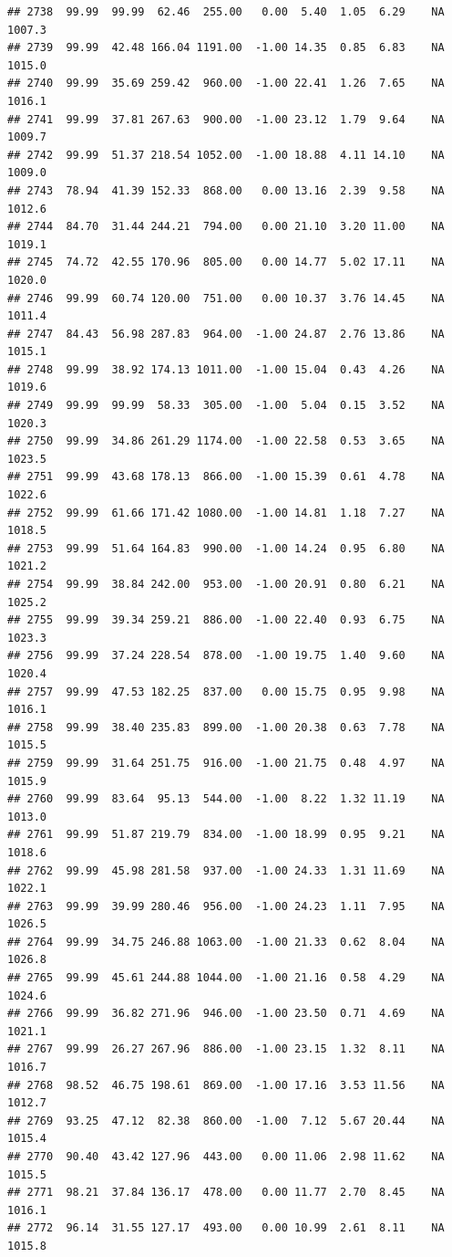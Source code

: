 \documentclass{article}\usepackage{graphicx, color}
\makeatletter
\newenvironment{kframe}{%
 \def\at@end@of@kframe{}%
 \ifinner\ifhmode%
  \def\at@end@of@kframe{\end{minipage}}%
  \begin{minipage}{\columnwidth}%
 \fi\fi%
 \def\FrameCommand##1{\hskip\@totalleftmargin \hskip-\fboxsep
 \colorbox{shadecolor}{##1}\hskip-\fboxsep
     \hskip-\linewidth \hskip-\@totalleftmargin \hskip\columnwidth}%
 \MakeFramed {\advance\hsize-\width
   \@totalleftmargin\z@ \linewidth\hsize
   \@setminipage}}%
 {\par\unskip\endMakeFramed%
 \at@end@of@kframe}
\newenvironment{knitrout}{}{} %
\makeatother
\begin{document}
\begin{knitrout}
\begin{kframe}
\begin{verbatim}
## 2738  99.99  99.99  62.46  255.00   0.00  5.40  1.05  6.29    NA 1007.3
## 2739  99.99  42.48 166.04 1191.00  -1.00 14.35  0.85  6.83    NA 1015.0
## 2740  99.99  35.69 259.42  960.00  -1.00 22.41  1.26  7.65    NA 1016.1
## 2741  99.99  37.81 267.63  900.00  -1.00 23.12  1.79  9.64    NA 1009.7
## 2742  99.99  51.37 218.54 1052.00  -1.00 18.88  4.11 14.10    NA 1009.0
## 2743  78.94  41.39 152.33  868.00   0.00 13.16  2.39  9.58    NA 1012.6
## 2744  84.70  31.44 244.21  794.00   0.00 21.10  3.20 11.00    NA 1019.1
## 2745  74.72  42.55 170.96  805.00   0.00 14.77  5.02 17.11    NA 1020.0
## 2746  99.99  60.74 120.00  751.00   0.00 10.37  3.76 14.45    NA 1011.4
## 2747  84.43  56.98 287.83  964.00  -1.00 24.87  2.76 13.86    NA 1015.1
## 2748  99.99  38.92 174.13 1011.00  -1.00 15.04  0.43  4.26    NA 1019.6
## 2749  99.99  99.99  58.33  305.00  -1.00  5.04  0.15  3.52    NA 1020.3
## 2750  99.99  34.86 261.29 1174.00  -1.00 22.58  0.53  3.65    NA 1023.5
## 2751  99.99  43.68 178.13  866.00  -1.00 15.39  0.61  4.78    NA 1022.6
## 2752  99.99  61.66 171.42 1080.00  -1.00 14.81  1.18  7.27    NA 1018.5
## 2753  99.99  51.64 164.83  990.00  -1.00 14.24  0.95  6.80    NA 1021.2
## 2754  99.99  38.84 242.00  953.00  -1.00 20.91  0.80  6.21    NA 1025.2
## 2755  99.99  39.34 259.21  886.00  -1.00 22.40  0.93  6.75    NA 1023.3
## 2756  99.99  37.24 228.54  878.00  -1.00 19.75  1.40  9.60    NA 1020.4
## 2757  99.99  47.53 182.25  837.00   0.00 15.75  0.95  9.98    NA 1016.1
## 2758  99.99  38.40 235.83  899.00  -1.00 20.38  0.63  7.78    NA 1015.5
## 2759  99.99  31.64 251.75  916.00  -1.00 21.75  0.48  4.97    NA 1015.9
## 2760  99.99  83.64  95.13  544.00  -1.00  8.22  1.32 11.19    NA 1013.0
## 2761  99.99  51.87 219.79  834.00  -1.00 18.99  0.95  9.21    NA 1018.6
## 2762  99.99  45.98 281.58  937.00  -1.00 24.33  1.31 11.69    NA 1022.1
## 2763  99.99  39.99 280.46  956.00  -1.00 24.23  1.11  7.95    NA 1026.5
## 2764  99.99  34.75 246.88 1063.00  -1.00 21.33  0.62  8.04    NA 1026.8
## 2765  99.99  45.61 244.88 1044.00  -1.00 21.16  0.58  4.29    NA 1024.6
## 2766  99.99  36.82 271.96  946.00  -1.00 23.50  0.71  4.69    NA 1021.1
## 2767  99.99  26.27 267.96  886.00  -1.00 23.15  1.32  8.11    NA 1016.7
## 2768  98.52  46.75 198.61  869.00  -1.00 17.16  3.53 11.56    NA 1012.7
## 2769  93.25  47.12  82.38  860.00  -1.00  7.12  5.67 20.44    NA 1015.4
## 2770  90.40  43.42 127.96  443.00   0.00 11.06  2.98 11.62    NA 1015.5
## 2771  98.21  37.84 136.17  478.00   0.00 11.77  2.70  8.45    NA 1016.1
## 2772  96.14  31.55 127.17  493.00   0.00 10.99  2.61  8.11    NA 1015.8

\end{verbatim}
\end{kframe}
\end{knitrout}
\end{document}
